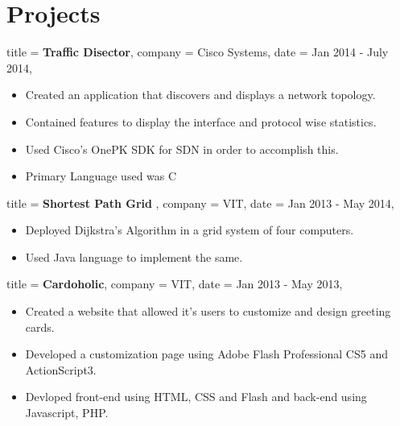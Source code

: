 \documentclass{simplecv}
\begin{document}
\section{Projects}


\begin{position}
     {
      title   = \textbf{Traffic Disector},
      company = Cisco Systems,
      date = Jan 2014 - July 2014,
      }
      \begin{itemize}    
	      \item Created an application that discovers and displays a network topology.	      
        \item Contained features to display the interface and protocol wise statistics.
        \item Used Cisco's OnePK SDK for SDN in order to accomplish this.
        \item Primary Language used was C
	     \end{itemize}
 \end{position}
 \vfill                                                                      
 \begin{position}
   {
    title   = \textbf{Shortest Path Grid },
    company = VIT, 
    date    =  Jan 2013 - May 2014,
   }
	 \begin{itemize}
        \item  Deployed Dijkstra's Algorithm in a grid system of four computers.
        \item  Used Java language to implement the same.
    \end{itemize}
	\end{position}
\vfill
   \begin{position}
   {
    title   = \textbf{Cardoholic},
    company = VIT, 
    date    =  Jan 2013 - May 2013,
   }
	 \begin{itemize}
        \item  Created a website that allowed it's users to customize and design greeting cards.
        \item  Developed a customization page using Adobe Flash Professional CS5 and ActionScript3.
        \item  Devloped front-end using HTML, CSS and Flash and back-end using Javascript, PHP.
    \end{itemize}
	\end{position}

 
\end{document}
